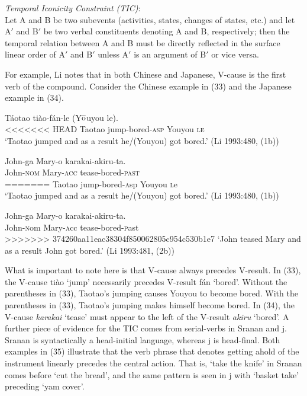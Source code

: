 \documentclass[output=paper]{LSP/langsci}
\begin{document}
\begin{exe}
\begin{exe}
\begin{exe}
\begin{exe}
{\begin{exe}
\begin{exe}

\ex
 \emph{Temporal Iconicity Constraint (TIC)}:\\
 Let A and B be two subevents (activities, states, changes of states, etc.) and let A$'$ and B$'$ be two verbal constituents denoting A and B, respectively; then the temporal relation between A and B must be directly reflected in the surface linear order of A$'$ and B$'$ unless A$'$ is an argument of B$'$ or vice versa.
 
 \end{exe}

For example, Li notes that in both Chinese and Japanese, V-cause is the first verb of the compound. Consider the Chinese example in (33) and the Japanese example in (34).

 \begin{exe}
 
 \ex \gll T\'{a}otao ti\`{a}o-f\'{a}n-le (Y$\overline{\rm{o}}$uyou le).\\
<<<<<<< HEAD
 Taotao jump-bored-\textsc{asp} Youyou \textsc{le}\\
 \glt `Taotao jumped and as a result he/(Youyou) got bored.' (Li 1993:480, (1b))
 
 \ex \gll John-ga Mary-o karakai-akiru-ta.\\
 John-\textsc{nom} Mary-\textsc{acc} tease-bored-\textsc{past}\\
=======
 Taotao jump-bored-{\textsc asp} Youyou {\textsc le}\\
 \glt `Taotao jumped and as a result he/(Youyou) got bored.' (Li 1993:480, (1b))
 
 \ex \gll John-ga Mary-o karakai-akiru-ta.\\
 John-{\textsc nom} Mary-{\textsc acc} tease-bored-{\textsc past}\\
>>>>>>> 374260aa11eac38304f850062805c954c530b1e7
 \glt `John teased Mary and as a result John got bored.'  (Li 1993:481, (2b))
 
 \end{exe}

What is important to note here is that V-cause always precedes V-result. In (33), the V-cause ti\`ao `jump' necessarily precedes V-result f\'an `bored'. Without the parentheses in (33), Taotao's jumping causes Youyou to become bored. With the parentheses in (33), Taotao's jumping makes himself become bored. In (34), the V-cause \textit{karakai} `tease' must appear to the left of the V-result \textit{akiru} `bored'. A further piece of evidence for the TIC comes from serial-verbs in Sranan and j. Sranan is syntactically a head-initial language, whereas j is head-final. Both examples in (35) illustrate that the verb phrase that denotes getting ahold of the instrument linearly precedes the central action. That is, `take the knife' in Sranan comes before `cut the bread', and the same pattern is seen in j with `basket take' preceding `yam cover'.


\end{exe}}
\end{exe}
\end{exe}
\end{exe}
\end{exe}
\end{document}

